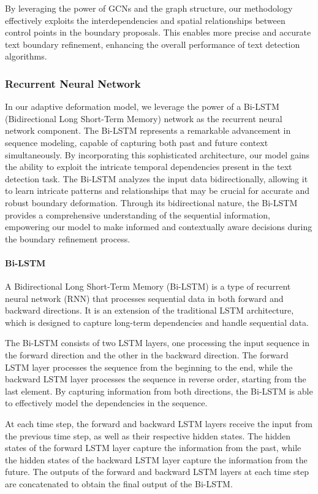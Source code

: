 By leveraging the power of GCNs and the graph structure, our methodology effectively exploits the interdependencies and spatial relationships between control points in the boundary proposals. This enables more precise and accurate text boundary refinement, enhancing the overall performance of text detection algorithms.


\subsubsection{Recurrent Neural Network}
In our adaptive deformation model, we leverage the power of a Bi-LSTM (Bidirectional Long Short-Term Memory) network as the recurrent neural network component. The Bi-LSTM represents a remarkable advancement in sequence modeling, capable of capturing both past and future context simultaneously. By incorporating this sophisticated architecture, our model gains the ability to exploit the intricate temporal dependencies present in the text detection task. The Bi-LSTM analyzes the input data bidirectionally, allowing it to learn intricate patterns and relationships that may be crucial for accurate and robust boundary deformation. Through its bidirectional nature, the Bi-LSTM provides a comprehensive understanding of the sequential information, empowering our model to make informed and contextually aware decisions during the boundary refinement process.

\paragraph{Bi-LSTM}\hfill \break
A Bidirectional Long Short-Term Memory (Bi-LSTM) is a type of recurrent neural network (RNN) that processes sequential data in both forward and backward directions. It is an extension of the traditional LSTM architecture, which is designed to capture long-term dependencies and handle sequential data.

The Bi-LSTM consists of two LSTM layers, one processing the input sequence in the forward direction and the other in the backward direction. The forward LSTM layer processes the sequence from the beginning to the end, while the backward LSTM layer processes the sequence in reverse order, starting from the last element. By capturing information from both directions, the Bi-LSTM is able to effectively model the dependencies in the sequence.

At each time step, the forward and backward LSTM layers receive the input from the previous time step, as well as their respective hidden states. The hidden states of the forward LSTM layer capture the information from the past, while the hidden states of the backward LSTM layer capture the information from the future. The outputs of the forward and backward LSTM layers at each time step are concatenated to obtain the final output of the Bi-LSTM.


